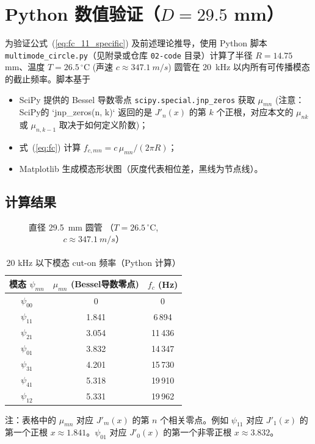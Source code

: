 \documentclass[12pt,a4paper]{article}
\begin{document}
\section{Python 数值验证（\texorpdfstring{$D=29.5$ mm}{D=29.5 mm}）}
\label{sec:python_validation}

为验证公式~(\ref{eq:fc_11_specific}) 及前述理论推导，使用 Python 脚本\texttt{multimode\_circle.py}（见附录或仓库 \texttt{02-code} 目录）计算了半径 $R=14.75$ mm、温度 $T=26.5\,^{\circ}\mathrm{C}$ (声速 $c \approx \SI{347.1}{m/s}$) 圆管在 \SI{20}{\kilo\hertz} 以内所有可传播模态的截止频率。脚本基于
\begin{itemize}
  \item SciPy 提供的 Bessel 导数零点 \verb|scipy.special.jnp_zeros| 获取 $\mu_{mn}$ (注意：SciPy的 `jnp_zeros(n, k)` 返回的是 $J'_n(x)$ 的第 $k$ 个正根，对应本文的 $\mu_{nk}$ 或 $\mu_{n,k-1}$ 取决于如何定义阶数)；
  \item 式~(\ref{eq:fc}) 计算 $f_{c,mn}=c\,\mu_{mn}/(2\pi R)$；
  \item Matplotlib 生成模态形状图（灰度代表相位差，黑线为节点线）。
\end{itemize}

\subsection{计算结果}

\begin{table}[h]
    \centering
    \caption{直径 \SI{29.5}{mm} 圆管 （$T=26.5\,^{\circ}$C, $c \approx \SI{347.1}{m/s}$）\\\\20 kHz 以下模态 cut-on 频率（Python 计算）}
    \label{tab:python-fc}
    \begin{tabular}{ccc}
        \toprule
        模态 $\psi_{mn}$ & $\mu_{mn}$ (Bessel导数零点) & $f_{c}$ (Hz) \\
        \midrule
        $\psi_{00}$ & 0 & 0 \\
        $\psi_{11}$ & 1.841 & 6\,894 \\
        $\psi_{21}$ & 3.054 & 11\,436 \\
        $\psi_{01}$ & 3.832 & 14\,347 \\
        $\psi_{31}$ & 4.201 & 15\,730 \\
        $\psi_{41}$ & 5.318 & 19\,910 \\
        $\psi_{12}$ & 5.331 & 19\,962 \\
        \bottomrule
    \end{tabular}
\end{table}
注：表格中的 $\mu_{mn}$ 对应 $J'_m(x)$ 的第 $n$ 个相关零点。例如 $\psi_{11}$ 对应 $J'_1(x)$ 的第一个正根 $x \approx 1.841$。$\psi_{01}$ 对应 $J'_0(x)$ 的第一个非零正根 $x \approx 3.832$。
\end{document}
